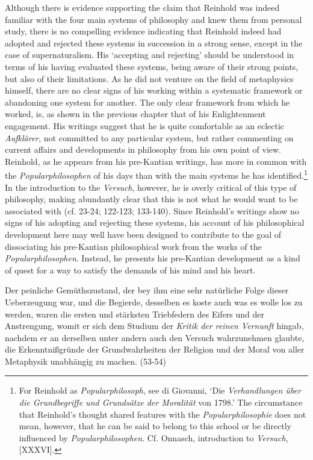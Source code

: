  Although there is evidence supporting the claim that Reinhold was indeed familiar with the four main systems of philosophy and knew them from personal study, there is no compelling evidence indicating that Reinhold indeed had adopted and rejected these systems in succession in a strong sense, except in the case of supernaturalism. His `accepting and rejecting' should be understood in terms of his having evaluated these systems, being aware of their strong points, but also of their limitations. As he did not venture on the field of metaphysics himself, there are no clear signs of his working within a systematic framework or abandoning one system for another. The only clear framework from which he worked, is, as shown in the previous chapter that of his Enlightenment engagement. His writings suggest that he is quite comfortable as an eclectic \textit{Aufkl\"{a}rer}, not committed to any particular system, but rather commenting on current affairs and developments in philosophy from his own point of view. Reinhold, as he appears from his pre{-}Kantian writings, has more in common with the \textit{Popularphilosophen} of his days than with the main systems he has identified.\footnote{ For Reinhold as \textit{Popularphilosoph}, see di Giovanni, `Die \textit{Verhandlungen \"{u}ber die Grundbegriffe und Grunds\"{a}tze der Moralit\"{a}t} von 1798.' The circumstance that Reinhold's thought shared features with the \textit{Popularphilosophie} does not mean, however, that he can be said to belong to this school or be directly influenced by \textit{Popularphilosophen}. Cf. Onnasch, introduction to \textit{Versuch}, [XXXVI]. } In the introduction to the \textit{Versuch}, however, he is overly critical of this type of philosophy, making abundantly clear that this is not what he would want to be associated with (cf. 23{-}24; 122{-}123; 133{-}140). Since Reinhold's writings show no signs of his adopting and rejecting these systems, his account of his philosophical development here may well have been designed to contribute to the goal of dissociating his pre{-}Kantian philosophical work from the works of the \textit{Popularphilosophen}. Instead, he presents his pre{-}Kantian development as a kind of quest for a way to satisfy the demands of his mind and his heart. 

Der peinliche Gem\"{u}thszustand, der bey ihm eine sehr nat\"{u}rliche Folge dieser Ueberzeugung war, und die Begierde, desselben es koste auch was es wolle los zu werden, waren die ersten und st\"{a}rksten Triebfedern des Eifers und der Anstrengung, womit er sich dem Studium der \textit{Kritik der reinen Vernunft }hingab, nachdem er an derselben unter andern auch den Versuch wahrzunehmen glaubte, die Erkenntni\ss{}gr\"{u}nde der Grundwahrheiten der Religion und der Moral von aller Metaphysik unabh\"{a}ngig zu machen. (53{-}54)

